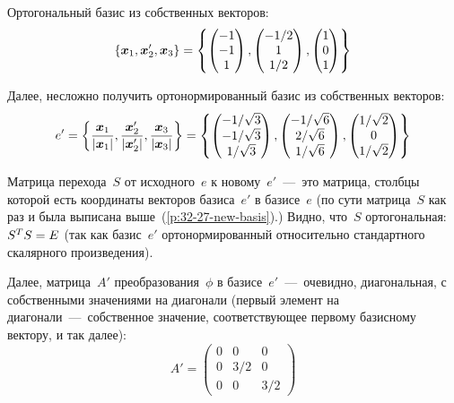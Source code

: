 \documentclass[a4paper,12pt]{article}
\theoremstyle{remark}
\begin{document}
\begin{solution}
    Ортогональный базис из собственных векторов:
    \[
      \{\boldsymbol x_1, \boldsymbol x_2', \boldsymbol x_3\} = \left\{
        \begin{pmatrix}
          -1 \\ -1 \\ 1
        \end{pmatrix},
        \begin{pmatrix}
          -1/2 \\ 1 \\ 1/2
        \end{pmatrix},
        \begin{pmatrix}
          1 \\ 0 \\ 1
        \end{pmatrix}
      \right\}
    \]
    
    Далее, несложно получить ортонормированный базис из собственных векторов:
    \begin{equation}\label{p:32-27-new-basis}
      e' = \left\{\frac{\boldsymbol x_1}{|\boldsymbol x_1|}, \frac{\boldsymbol x_2'}{|\boldsymbol x_2'|}, \frac{\boldsymbol x_3}{|\boldsymbol x_3|}\right\}
      = \left\{
        \begin{pmatrix}
          -1/\sqrt{3} \\ -1/\sqrt{3} \\ 1/\sqrt{3}
        \end{pmatrix},
        \begin{pmatrix}
          -1/\sqrt{6} \\ 2/\sqrt{6} \\ 1/\sqrt{6}
        \end{pmatrix},
        \begin{pmatrix}
          1/\sqrt{2} \\ 0 \\ 1/\sqrt{2}
        \end{pmatrix}
      \right\}
    \end{equation}
    
    Матрица перехода~$S$ от исходного~$e$ к новому~$e'$~---~это матрица, столбцы которой есть координаты векторов базиса~$e'$ в базисе~$e$ (по сути матрица~$S$ как раз и была выписана выше~(\ref{p:32-27-new-basis}).)
    Видно, что~$S$ ортогональная: $S^T S \hm= E$ (так как базис~$e'$ ортонормированный относительно стандартного скалярного произведения).
    
    Далее, матрица~$A'$ преобразования~$\phi$ в базисе~$e'$~---~очевидно, диагональная, с собственными значениями на диагонали (первый элемент на диагонали~---~собственное значение, соответствующее первому базисному вектору, и так далее):
    \[
      A' = \begin{pmatrix}
        0 & 0   & 0\\
        0 & 3/2 & 0\\
        0 & 0   & 3/2
      \end{pmatrix}
    \]
    

\end{solution}
\end{document}
